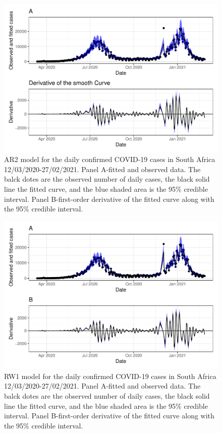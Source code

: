 \documentclass[10pt,letterpaper]{article}
\begin{document}
\begin{figure}[h]
\includegraphics[width=0.99\linewidth]{COVIDincidenceSA_files/figure-latex/unnamed-chunk-13-1} \caption{AR2 model for the daily confirmed COVID-19 cases in South Africa 12/03/2020-27/02/2021.  Panel A-fitted and observed data. The balck dotes are the observed number of daily cases, the black solid line the fitted curve, and the blue shaded area is the 95\% credible interval. Panel B-first-order derivative of the fitted curve along with the 95\% credible interval.}\label{fig:ar2fitted}
\end{figure}

\begin{figure}[h]
\includegraphics[width=0.99\linewidth]{COVIDincidenceSA_files/figure-latex/unnamed-chunk-14-1} \caption{RW1 model for the daily confirmed COVID-19 cases in South Africa 12/03/2020-27/02/2021.  Panel A-fitted and observed data. The balck dotes are the observed number of daily cases, the black solid line the fitted curve, and the blue shaded area is the 95\% credible interval. Panel B-first-order derivative of the fitted curve along with the 95\% credible interval.}\label{fig:rw1fitted}
\end{figure}
\end{document}

